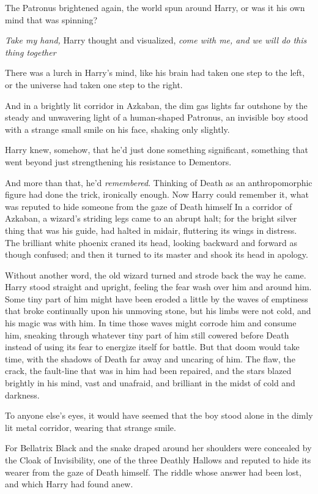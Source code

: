 The Patronus brightened again, the world spun around Harry, or was it his own
mind that was spinning?

\emph{Take my hand,} Harry thought and visualized, \emph{come with me, and we
will do this thing together{\el}}

There was a lurch in Harry's mind, like his brain had taken one step to the
left, or the universe had taken one step to the right.

And in a brightly lit corridor in Azkaban, the dim gas lights far outshone by
the steady and unwavering light of a human-shaped Patronus, an invisible boy
stood with a strange small smile on his face, shaking only slightly.

Harry knew, somehow, that he'd just done something significant, something that
went beyond just strengthening his resistance to Dementors.

And more than that, he'd \emph{remembered}. Thinking of Death as an
anthropomorphic figure had done the trick, ironically enough. Now Harry could
remember it, what was reputed to hide someone from the gaze of Death
himself{\el}
\sbreak
In a corridor of Azkaban, a wizard's striding legs came to an abrupt halt; for
the bright silver thing that was his guide, had halted in midair, fluttering
its wings in distress. The brilliant white phoenix craned its head, looking
backward and forward as though confused; and then it turned to its master and
shook its head in apology.

Without another word, the old wizard turned and strode back the way he came.
\sbreak
Harry stood straight and upright, feeling the fear wash over him and around
him. Some tiny part of him might have been eroded a little by the waves of
emptiness that broke continually upon his unmoving stone, but his limbs were
not cold, and his magic was with him. In time those waves might corrode him and
consume him, sneaking through whatever tiny part of him still cowered before
Death instead of using its fear to energize itself for battle. But that doom
would take time, with the shadows of Death far away and uncaring of him. The
flaw, the crack, the fault-line that was in him had been repaired, and the
stars blazed brightly in his mind, vast and unafraid, and brilliant in the
midst of cold and darkness.

To anyone else's eyes, it would have seemed that the boy stood alone in the
dimly lit metal corridor, wearing that strange smile.

For Bellatrix Black and the snake draped around her shoulders were concealed by
the Cloak of Invisibility, one of the three Deathly Hallows and reputed to hide
its wearer from the gaze of Death himself. The riddle whose answer had been
lost, and which Harry had found anew.

